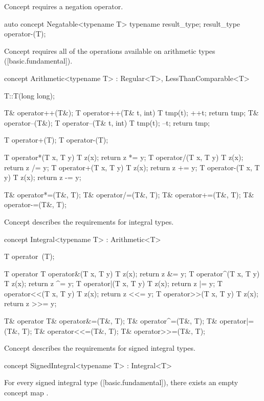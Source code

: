 \documentclass[american,twoside]{book}
\begin{document}
\pnum
Concept  requires a negation operator.
\begin{itemdecl}
auto concept Negatable<typename T> {
  typename result_type;
  result_type operator-(T);
}
\end{itemdecl}

\pnum
Concept  requires all of the operations available on
arithmetic types ([basic.fundamental]). 

\begin{itemdecl}
concept Arithmetic<typename T> : Regular<T>, LessThanComparable<T> {
  T::T(long long);

  T& operator++(T&);
  T operator++(T& t, int) { T tmp(t); ++t; return tmp; }
  T& operator--(T&);
  T operator--(T& t, int) { T tmp(t); --t; return tmp; }

  T operator+(T);
  T operator-(T);

  T operator*(T x, T y) { T z(x); return z *= y; }
  T operator/(T x, T y) { T z(x); return z /= y; }
  T operator+(T x, T y) { T z(x); return z += y; }
  T operator-(T x, T y) { T z(x); return z -= y; }

  T& operator*=(T&, T);
  T& operator/=(T&, T);
  T& operator+=(T&, T);
  T& operator-=(T&, T);
}
\end{itemdecl}

\pnum 
Concept  describes the requirements for integral
types.

\begin{itemdecl}
concept Integral<typename T> : Arithmetic<T> {
  T operator~(T);

  T operator%
  T operator&(T x, T y)  { T z(x); return z &= y; }
  T operator^(T x, T y)  { T z(x); return z ^= y; }
  T operator|(T x, T y)  { T z(x); return z |= y; }
  T operator<<(T x, T y) { T z(x); return z <<= y; }
  T operator>>(T x, T y) { T z(x); return z >>= y; }

  T& operator%
  T& operator&=(T&, T);
  T& operator^=(T&, T);
  T& operator|=(T&, T);
  T& operator<<=(T&, T);
  T& operator>>=(T&, T);
}
\end{itemdecl}

\pnum
Concept  describes the requirements for signed
integral types.

\begin{itemdecl}
concept SignedIntegral<typename T> : Integral<T> { }
\end{itemdecl}

\pnum
For every signed integral type  ([basic.fundamental]), there exists an
empty concept map .
\end{document}
